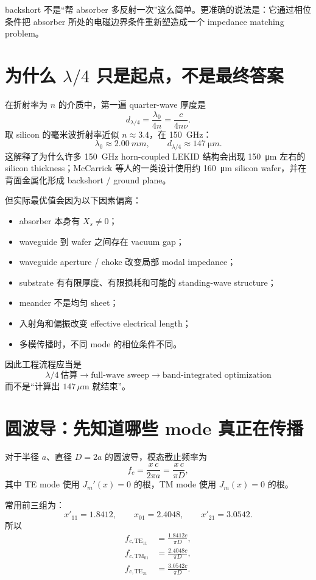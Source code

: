 \documentclass[11pt,a4paper,openany]{ctexrep}
\begin{document}
\begin{intuitionbox}
backshort 不是“帮 absorber 多反射一次”这么简单。更准确的说法是：它通过相位条件把 absorber 所处的电磁边界条件重新塑造成一个 impedance matching problem。
\end{intuitionbox}

\section{为什么 $\lambda/4$ 只是起点，不是最终答案}

在折射率为 $n$ 的介质中，第一遍 quarter-wave 厚度是
\[
d_{\lambda/4}=\frac{\lambda_0}{4n}=\frac{c}{4n\nu}.
\]
取 silicon 的毫米波折射率近似 $n\approx3.4$，在 \SI{150}{GHz}：
\[
\lambda_0\approx\SI{2.00}{mm},
\qquad
d_{\lambda/4}\approx\SI{147}{\micro m}.
\]
这解释了为什么许多 \SI{150}{GHz} horn-coupled LEKID 结构会出现 \SI{150}{\micro m} 左右的 silicon thickness；McCarrick 等人的一类设计使用约 \SI{160}{\micro m} silicon wafer，并在背面金属化形成 backshort / ground plane。

但实际最优值会因为以下因素偏离：
\begin{itemize}
  \item absorber 本身有 $X_s\neq0$；
  \item waveguide 到 wafer 之间存在 vacuum gap；
  \item waveguide aperture / choke 改变局部 modal impedance；
  \item substrate 有有限厚度、有限损耗和可能的 standing-wave structure；
  \item meander 不是均匀 sheet；
  \item 入射角和偏振改变 effective electrical length；
  \item 多模传播时，不同 mode 的相位条件不同。
\end{itemize}

因此工程流程应当是
\[
\boxed{
\lambda/4\ \text{估算}
\rightarrow
\text{full-wave sweep}
\rightarrow
\text{band-integrated optimization}
}
\]
而不是“计算出 $147\,\mu$m 就结束”。

\section{圆波导：先知道哪些 mode 真正在传播}

对于半径 $a$、直径 $D=2a$ 的圆波导，模态截止频率为
\[
f_c=\frac{x\,c}{2\pi a}=\frac{x\,c}{\pi D},
\]
其中 TE mode 使用 $J_m'(x)=0$ 的根，TM mode 使用 $J_m(x)=0$ 的根。

常用前三组为：
\[
x'_{11}=1.8412,\qquad x_{01}=2.4048,\qquad x'_{21}=3.0542.
\]
所以
\[
\begin{aligned}
f_{c,\mathrm{TE}_{11}}&=\frac{1.8412c}{\pi D},\\
f_{c,\mathrm{TM}_{01}}&=\frac{2.4048c}{\pi D},\\
f_{c,\mathrm{TE}_{21}}&=\frac{3.0542c}{\pi D}.
\end{aligned}
\]
\end{document}
